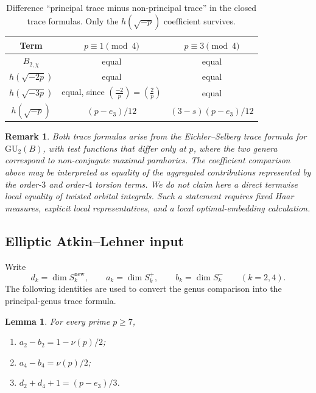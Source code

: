 \documentclass[10pt,a4paper]{amsart}
\newtheorem{lemma}[theorem]{Lemma}
\newtheorem{remark}[theorem]{Remark}
\newcommand{\GU}{\mathrm{GU}}
\newcommand{\snew}{S^{\mathrm{new}}}
\providecommand{\snew}{S^{\mathrm{new}}}
\begin{document}
	\begin{table}[ht]
		\centering
		\begin{tabular}{c|c|c}
			Term & $p\equiv1\pmod4$ & $p\equiv3\pmod4$ \\
			\hline
			$B_{2,\chi}$ & equal & equal \\
			$h(\sqrt{-2p})$ & equal & equal \\
			$h(\sqrt{-3p})$ & equal, since $\left(\frac{-2}{p}\right)=\left(\frac2p\right)$ & equal \\
			$h(\sqrt{-p})$ & $(p-e_3)/12$ & $(3-s)(p-e_3)/12$ \\
		\end{tabular}
		\caption{Difference ``principal trace minus non-principal trace'' in the
			closed trace formulas. Only the $h(\sqrt{-p})$ coefficient survives.}
		\label{tab:trace-coefficients}
	\end{table}
	
	\begin{remark}
		\label{rem:global-orbital}
		Both trace formulas arise from the Eichler--Selberg trace formula for
		$\GU_2(B)$, with test functions that differ only at $p$, where the two
		genera correspond to non-conjugate maximal parahorics. The coefficient
		comparison above may be interpreted as equality of the aggregated
		contributions represented by the order-$3$ and order-$4$ torsion terms.
		We do not claim here a direct termwise local equality of twisted orbital
		integrals. Such a statement requires fixed Haar measures, explicit local
		representatives, and a local optimal-embedding calculation.
	\end{remark}
	
	\subsection{Elliptic Atkin--Lehner input}
	\label{ss:elliptic-trace-input}
	
	Write
	\[
	d_k=\dim\snew_k,\qquad
	a_k=\dim S_k^+,
	\qquad b_k=\dim S_k^-
	\qquad(k=2,4).
	\]
	The following identities are used to convert the genus comparison into the
	principal-genus trace formula.
	
	\begin{lemma}	\label{lem:elliptic-input}
		For every prime $p\ge7$,
		\begin{enumerate}[label=\textup{(\alph*)},leftmargin=2.3em]
			\item $a_2-b_2=1-\nu(p)/2$;
			\item $a_4-b_4=\nu(p)/2$;
			\item $d_2+d_4+1=(p-e_3)/3$.
		\end{enumerate}
	\end{lemma}
	
\end{document}

